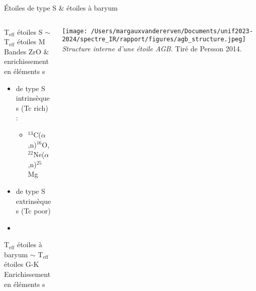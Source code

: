 \documentclass[10pt]{beamer}
\subtitle{Étude de spectres infrarouges de géantes rouges évoluées}
\date{}
\author{\small Margaux Vandererven}
\institute{\small Supervisé par Sophie Van Eck}
\begin{document}
\maketitle


\begin{frame}[fragile]{Étoiles de type S \& étoiles à baryum}

    \begin{columns}
            \begin{column}{0.6\textwidth}

                    T$_{\text{eff}}$ étoiles S $\sim$ T$_{\text{eff}}$ étoiles M  \\

                    Bandes ZrO \& enrichissement en éléments s
    

    					\begin{itemize}
    						\item de type S intrinsèques (Tc rich) :
    						\begin{itemize}
                                \item [] $^{13}$C($\alpha$,n)$^{16}$O, $^{22}$Ne($\alpha$,n)$^{25}$Mg
                            \end{itemize}
    						\item de type S extrinsèques (Tc poor)
    						\item[] 
    					\end{itemize} 
                        \vspace{0.5cm}

                        T$_{\text{eff}}$ étoiles à baryum $\sim$ T$_{\text{eff}}$ étoiles G-K \\
                        Enrichissement en éléments s
            \end{column}
            \begin{column}{0.4\textwidth}
                \centering
                \texttt{[image: /Users/margauxvandererven/Documents/unif2023-2024/spectre\_IR/rapport/figures/agb\_structure.jpeg]}
    			\textit{Structure interne d'une étoile AGB.} Tiré de Persson 2014.
            \end{column}
    \end{columns}
\end{frame}
\end{document}
